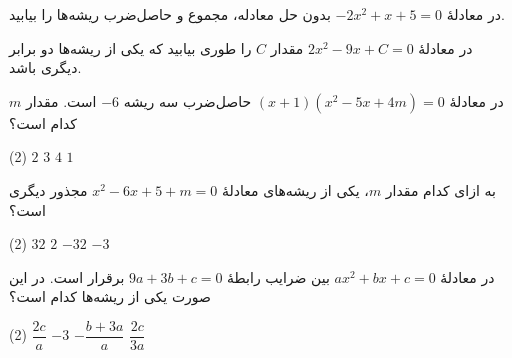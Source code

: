 \vspace{1.5cm}


\begin{example}
    در معادلۀ
    $-2x^2+x+5=0$
    بدون حل معادله، مجموع و حاصل‌ضرب ریشه‌ها را بیابید.
\end{example}


\begin{example}
    در معادلۀ
    $2x^2-9x+C=0$
    مقدار \(C\) را طوری بیابید که یکی از ریشه‌ها دو برابر دیگری باشد.
\end{example}

\vspace{0.4\baselineskip}


\begin{example}
    در معادلۀ
    $(x+1)(x^2-5x+4m)=0$
    حاصل‌ضرب سه ریشه \(-6\) است.
    مقدار \(m\) کدام است؟

    \begin{tasks}(2)
        \task \(2\)
        \task \(3\)
        \task \(4\)
        \task \(1\)
    \end{tasks}
\end{example}


\begin{example}
    به ازای کدام مقدار \(m\)، یکی از ریشه‌های معادلۀ
    $x^2-6x+5+m=0$
    مجذور دیگری است؟

    \begin{tasks}(2)
        \task \(32\)
        \task \(2\)
        \task \(-32\)
        \task \(-3\)
    \end{tasks}
\end{example}


\begin{example}
    در معادلۀ
    $ax^2+bx+c=0$
    بین ضرایب رابطهٔ
    $9a+3b+c=0$
    برقرار است. در این صورت یکی از ریشه‌ها کدام است؟

    \begin{tasks}(2)
        \task \(\dfrac{2c}{a}\)
        \task \(-3\)
        \task \(-\dfrac{b+3a}{a}\)
        \task \(\dfrac{2c}{3a}\)
    \end{tasks}
\end{example}

